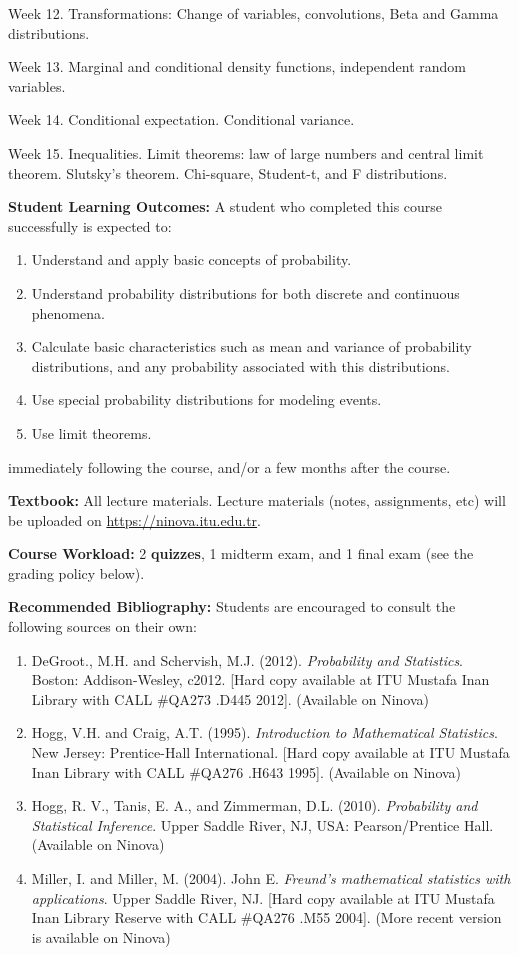 \documentclass[
  12pt,
]{article}
\providecommand{\tightlist}{%
  \setlength{\itemsep}{0pt}\setlength{\parskip}{0pt}}
\begin{document}
Week 12. Transformations: Change of variables, convolutions, Beta and
Gamma distributions.

Week 13. Marginal and conditional density functions, independent random
variables.

Week 14. Conditional expectation. Conditional variance.

Week 15. Inequalities. Limit theorems: law of large numbers and central
limit theorem. Slutsky's theorem. Chi-square, Student-t, and F
distributions.

\textbf{Student Learning Outcomes:} A student who completed this course
successfully is expected to:

\begin{enumerate}
\def\labelenumi{\arabic{enumi}.}
\tightlist
\item
  Understand and apply basic concepts of probability.
\item
  Understand probability distributions for both discrete and continuous
  phenomena.
\item
  Calculate basic characteristics such as mean and variance of
  probability distributions, and any probability associated with this
  distributions.
\item
  Use special probability distributions for modeling events.
\item
  Use limit theorems.
\end{enumerate}

immediately following the course, and/or a few months after the course.

\textbf{Textbook:} All lecture materials. Lecture materials (notes,
assignments, etc) will be uploaded on
\href{Ninova}{https://ninova.itu.edu.tr}.

\textbf{Course Workload:} 2 \textbf{quizzes}, 1 midterm exam, and 1
final exam (see the grading policy below).

\textbf{Recommended Bibliography:} Students are encouraged to consult
the following sources on their own:

\begin{enumerate}
\def\labelenumi{\arabic{enumi}.}
\tightlist
\item
  DeGroot., M.H. and Schervish, M.J. (2012).
  \textit{Probability and Statistics}. Boston: Addison-Wesley, c2012.
  {[}Hard copy available at ITU Mustafa Inan Library with CALL \#QA273
  .D445 2012{]}. (Available on Ninova)
\item
  Hogg, V.H. and Craig, A.T. (1995).
  \textit{Introduction to Mathematical Statistics}. New Jersey:
  Prentice-Hall International. {[}Hard copy available at ITU Mustafa
  Inan Library with CALL \#QA276 .H643 1995{]}. (Available on Ninova)
\item
  Hogg, R. V., Tanis, E. A., and Zimmerman, D.L. (2010).
  \textit{Probability and Statistical Inference}. Upper Saddle River,
  NJ, USA: Pearson/Prentice Hall. (Available on Ninova)
\item
  Miller, I. and Miller, M. (2004). John E.
  \textit{Freund's mathematical statistics with applications}. Upper
  Saddle River, NJ. {[}Hard copy available at ITU Mustafa Inan Library
  Reserve with CALL \#QA276 .M55 2004{]}. (More recent version is
  available on Ninova)
\end{enumerate}
\end{document}
